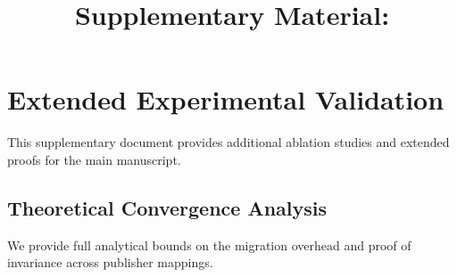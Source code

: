 \documentclass[10pt,a4paper,onecolumn]{../../packages/custom/sup}
\title{Supplementary Material: \ShortPaperTitle}
\author{\AuthorList}
\begin{document}
\maketitle

\section{Extended Experimental Validation}
This supplementary document provides additional ablation studies and extended proofs for the main manuscript.

\subsection{Theoretical Convergence Analysis}
We provide full analytical bounds on the migration overhead and proof of invariance across publisher mappings.

\printbibliography
\end{document}
